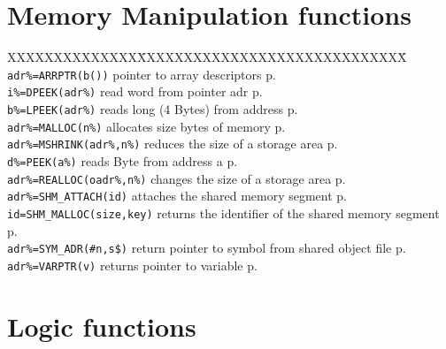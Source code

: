 \section{Memory Manipulation functions}
\begin{tabbing}
XXXXXXXXXXXXXX\=XXXXXXXXXXXXXXXXXXXXXXXXXXXXX\=\kill\\
\verb|adr%=ARRPTR(b())|  	\> pointer to array descriptors\> p.\pageref{ARRPTR}\\
\verb|i%=DPEEK(adr%)|	\>  read word from pointer adr\> p.\pageref{DPEEK}\\
\verb|b%=LPEEK(adr%)|  	\>reads long (4 Bytes) from address\> p.\pageref{LPEEK}\\
\verb|adr%=MALLOC(n%)| \> allocates size bytes of memory \> p.\pageref{MALLOC}\\
\verb|adr%=MSHRINK(adr%,n%)| \> reduces  the  size  of  a  storage  area \> p.\pageref{MSHRINK}\\
\verb|d%=PEEK(a%)| \>	 reads Byte from address a\> p.\pageref{PEEK}\\
\verb|adr%=REALLOC(oadr%,n%)| \> changes the size  of  a  storage  area \> p.\pageref{REALLOC}\\
\verb|adr%=SHM_ATTACH(id)| \> attaches the shared memory segment \> p.\pageref{SHMiATTACH}\\
\verb|id=SHM_MALLOC(size,key)| \> returns the identifier of the shared memory segment \> p.\pageref{SHMiMALLOC}\\
\verb|adr%=SYM_ADR(#n,s$)| \>return pointer to symbol from shared object file\> p.\pageref{SYMiADR}\\
\verb|adr%=VARPTR(v)| \>returns pointer to variable\> p.\pageref{VARPTR}\\
\end{tabbing}

\section{Logic functions}

